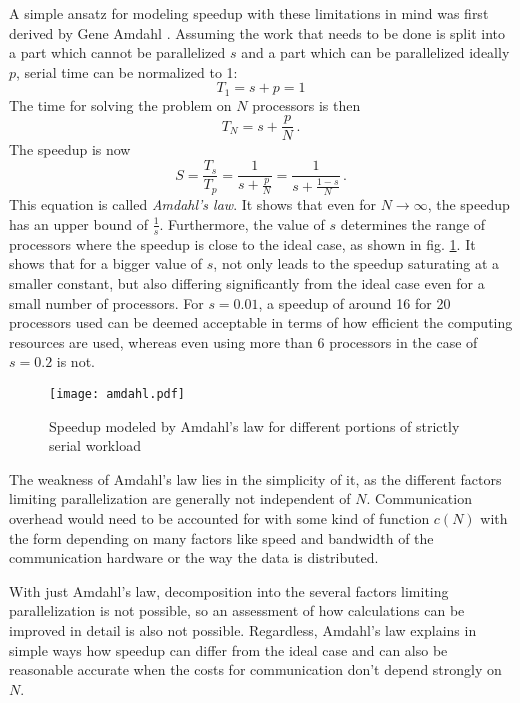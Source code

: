 \documentclass[main.tex]{subfiles}
\begin{document}
A simple ansatz for modeling speedup with these limitations in mind was first derived by Gene Amdahl \cite{amdahl_validity_1967}.
Assuming the work that needs to be done is split into a part which cannot be parallelized \(s\) and a part which can be parallelized ideally \(p\), serial time can be normalized to 1:
\begin{equation}
    T_1 = s + p = 1
\end{equation}
The time for solving the problem on \(N\) processors is then
\begin{equation}
    T_N = s + \frac{p}{N}\,.
\end{equation}
The speedup is now
\begin{equation}\label{eq:amdahls_law}
    S = \frac{T_s}{T_p} = \frac{1}{s + \frac{p}{N}} = \frac{1}{s + \frac{1 - s}{N}}\,.
\end{equation}
This equation is called \emph{Amdahl's law}.
It shows that even for \(N \to \infty\), the speedup has an upper bound of \(\frac{1}{s}\).
Furthermore, the value of \(s\) determines the range of processors where the speedup is close to the ideal case, as shown in fig. \ref{fig:amdahl}.
It shows that for a bigger value of \(s\), not only leads to the speedup saturating at a smaller constant, but also differing significantly from the ideal case even for a small number of processors.
For \(s = 0.01\), a speedup of around 16 for 20 processors used can be deemed acceptable in terms of how efficient the computing resources are used, whereas even using more than 6 processors in the case of \(s = 0.2\) is not.

\begin{figure}
    \centering
    \texttt{[image: amdahl.pdf]}
    \caption{Speedup modeled by Amdahl's law for different portions of strictly serial workload}
    \label{fig:amdahl}
\end{figure}

The weakness of Amdahl's law lies in the simplicity of it, as the different factors limiting parallelization are generally not independent of \(N\).
Communication overhead would need to be accounted for with some kind of function \(c(N)\) with the form depending on many factors like speed and bandwidth of the communication hardware or the way the data is distributed.

With just Amdahl's law, decomposition into the several factors limiting parallelization is not possible, so an assessment of how calculations can be improved in detail is also not possible.
Regardless, Amdahl's law explains in simple ways how speedup can differ from the ideal case and can also be reasonable accurate when the costs for communication don't depend strongly on \(N\).
\end{document}
